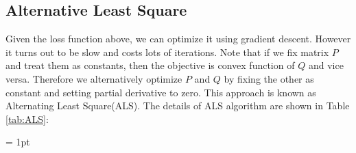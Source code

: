 \documentclass[journal, a4paper]{IEEEtran}
\begin{document}
\subsection{Alternative Least Square}
Given the loss function above, we can optimize it using gradient descent.
However it turns out to be slow and costs lots of iterations.
Note that if we fix matrix $P$ and treat them as constants, then the objective is convex function of $Q$ and vice versa.
Therefore we alternatively optimize $P$ and $Q$ by fixing the other as constant and setting partial derivative to zero.
This approach is known as Alternating Least Square(ALS).
The details of ALS algorithm are shown in Table \ref{tab:ALS}:
\begin{table}[!hbt]
  \centering
  \caption{Alternative Least Square}
  \label{tab:ALS}
  \tabcolsep = 1pt
\end{table}
\end{document}
